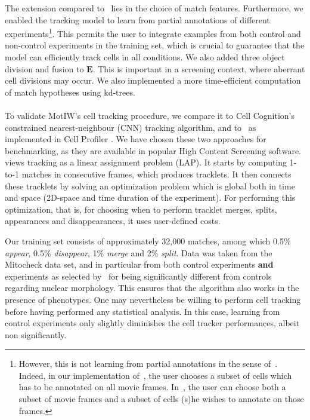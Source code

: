The extension compared to~\cite{lou} lies in the choice of match
features. Furthermore, we enabled the tracking model to learn from
partial annotations of different experiments\footnote{However, this is
  not learning from partial annotations in the sense
  of~\cite{loupartial}. Indeed, in our implementation of~\cite{lou},
  the user chooses a subset of cells which has to be annotated on all
  movie frames. In~\cite{loupartial}, the user can choose both a
  subset of movie frames and a subset of cells (s)he wishes to
  annotate on those frames.}. This permits the user to integrate
examples from both control and non-control experiments in the training
set, which is crucial to guarantee that the model can efficiently
track cells in all conditions. We also added three object division and
fusion to $\mathbf{E}$. This is important in a screening context,
where aberrant cell divisions may occur. We also implemented a more time-efficient computation of match hypotheses
using kd-trees.

\paragraph*{}
To validate MotIW's cell tracking procedure, we compare it to Cell Cognition's constrained nearest-neighbour (CNN) tracking algorithm, and to~\cite{jaqaman} as implemented in Cell Profiler \cite{Carpenter2006}. We have chosen these two approaches for benchmarking, as they are available in popular High Content Screening software. \cite{jaqaman} views tracking as a linear assignment problem (LAP). It starts by computing 1-to-1 matches in consecutive frames, which produces tracklets. It then connects these tracklets by solving an optimization problem which is global both in time and space (2D-space and time duration of the experiment). For performing this optimization, that is, for choosing when to perform tracklet merges, splits, appearances and disappearances, it uses user-defined costs. 

Our training set consists of approximately 32,000 matches, among which
0.5\% \textit{appear}, 0.5\% \textit{disappear}, 1\% \textit{merge}
and 2\% \textit{split}. Data was taken from the Mitocheck data
set, and in particular from both control experiments \textbf{and}
experiments as selected by~\cite{pmid20360735} for being significantly
different from controls regarding nuclear morphology. This ensures
that the algorithm also works in the presence of phenotypes. One may
nevertheless be willing to perform cell tracking before having
performed any statistical analysis. In this case, learning from
control experiments only slightly diminishes the cell tracker
performances, albeit non significantly. 

